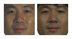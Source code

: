 \begin{figure}
\begin{center}
{\includegraphics[width=\columnwidth/12]{ch5/figures/00029_940928_fa.png}
\includegraphics[width=\columnwidth/12]{ch5/figures/00029_941031_fa.png}
}
\end{center}
\end{figure}
